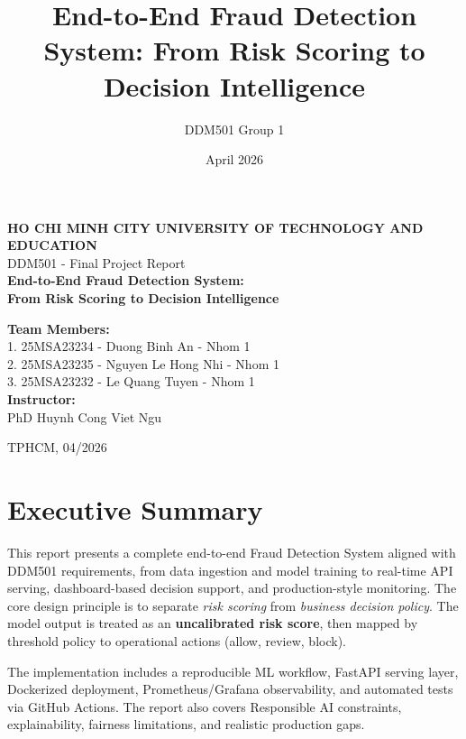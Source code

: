 \documentclass[11pt]{article}
\title{End-to-End Fraud Detection System: From Risk Scoring to Decision Intelligence}
\author{DDM501 Group 1}
\date{April 2026}
\begin{document}
\begin{titlepage}
    \centering
    {\Large \textbf{HO CHI MINH CITY UNIVERSITY OF TECHNOLOGY AND EDUCATION}}\\[0.5cm]
    {\large DDM501 - Final Project Report}\\[2.5cm]

    {\LARGE \textbf{End-to-End Fraud Detection System:}}\\[0.2cm]
    {\LARGE \textbf{From Risk Scoring to Decision Intelligence}}\\[2cm]

    \begin{flushleft}
    \textbf{Team Members:}\\[0.2cm]
    1. 25MSA23234 - Duong Binh An - Nhom 1\\
    2. 25MSA23235 - Nguyen Le Hong Nhi - Nhom 1\\
    3. 25MSA23232 - Le Quang Tuyen - Nhom 1\\[0.6cm]

    \textbf{Instructor:}\\
    PhD Huynh Cong Viet Ngu
    \end{flushleft}

    \vfill
    {\large TPHCM, 04/2026}
\end{titlepage}

\tableofcontents
\newpage

\section{Executive Summary}
This report presents a complete end-to-end Fraud Detection System aligned with DDM501 requirements, from data ingestion and model training to real-time API serving, dashboard-based decision support, and production-style monitoring. The core design principle is to separate \textit{risk scoring} from \textit{business decision policy}. The model output is treated as an \textbf{uncalibrated risk score}, then mapped by threshold policy to operational actions (allow, review, block).

The implementation includes a reproducible ML workflow, FastAPI serving layer, Dockerized deployment, Prometheus/Grafana observability, and automated tests via GitHub Actions. The report also covers Responsible AI constraints, explainability, fairness limitations, and realistic production gaps.

\end{document}
